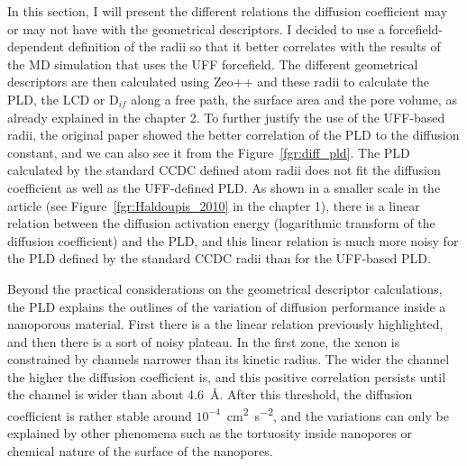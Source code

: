 \documentclass[main]{subfiles}
\begin{document}
In this section, I will present the different relations the diffusion coefficient may or may not have with the geometrical descriptors. I decided to use a forcefield-dependent definition of the radii so that it better correlates with the results of the MD simulation that uses the UFF forcefield. The different geometrical descriptors are then calculated using Zeo++ and these radii to calculate the PLD, the LCD or D$_{if}$ along a free path, the surface area and the pore volume, as already explained in the chapter 2. To further justify the use of the UFF-based radii, the original paper \cite{Hung_2021} showed the better correlation of the PLD to the diffusion constant, and we can also see it from the Figure~\ref{fgr:diff_pld}. The PLD calculated by the standard CCDC defined atom radii does not fit the diffusion coefficient as well as the UFF-defined PLD. As shown in a smaller scale in the article \cite{Haldoupis_2010} (see Figure~\ref{fgr:Haldoupis_2010} in the chapter 1), there is a linear relation between the diffusion activation energy (logarithmic transform of the diffusion coefficient) and the PLD, and this linear relation is much more noisy for the PLD defined by the standard CCDC radii than for the UFF-based PLD.

Beyond the practical considerations on the geometrical descriptor calculations, the PLD explains the outlines of the variation of diffusion performance inside a nanoporous material. First there is a the linear relation previously highlighted, and then there is a sort of noisy plateau. In the first zone, the xenon is constrained by channels narrower than its kinetic radius. The wider the channel the higher the diffusion coefficient is, and this positive correlation persists until the channel is wider than about \SI{4.6}{\angstrom}. After this threshold, the diffusion coefficient is rather stable around $10^{-4}$~\si{\square\cm\per\square\s}, and the variations can only be explained by other phenomena such as the tortuosity inside nanopores or chemical nature of the surface of the nanopores. 
\end{document}
